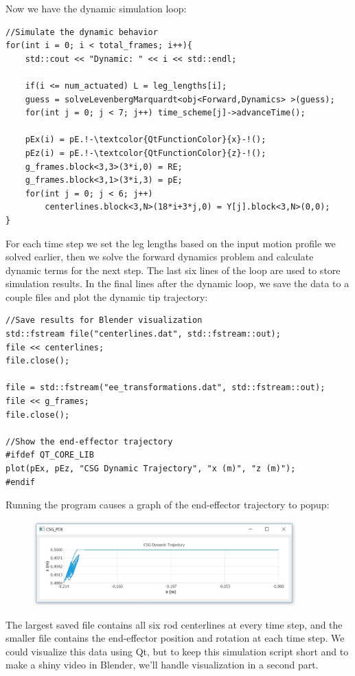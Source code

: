 \documentclass[12pt]{article}
\begin{document}
Now we have the dynamic simulation loop:
\begin{lstlisting}
//Simulate the dynamic behavior
for(int i = 0; i < total_frames; i++){
    std::cout << "Dynamic: " << i << std::endl;

    if(i <= num_actuated) L = leg_lengths[i];
    guess = solveLevenbergMarquardt<obj<Forward,Dynamics> >(guess);
    for(int j = 0; j < 7; j++) time_scheme[j]->advanceTime();

    pEx(i) = pE.!-\textcolor{QtFunctionColor}{x}-!();
    pEz(i) = pE.!-\textcolor{QtFunctionColor}{z}-!();
    g_frames.block<3,3>(3*i,0) = RE;
    g_frames.block<3,1>(3*i,3) = pE;
    for(int j = 0; j < 6; j++)
        centerlines.block<3,N>(18*i+3*j,0) = Y[j].block<3,N>(0,0);
}
\end{lstlisting}
For each time step we set the leg lengths based on the input motion profile we solved earlier, then we solve the forward dynamics problem and calculate dynamic terms for the next step. The last six lines of the loop are used to store simulation results. In the final lines after the dynamic loop, we save the data to a couple files and plot the dynamic tip trajectory:
\begin{lstlisting}
//Save results for Blender visualization
std::fstream file("centerlines.dat", std::fstream::out);
file << centerlines;
file.close();

file = std::fstream("ee_transformations.dat", std::fstream::out);
file << g_frames;
file.close();

//Show the end-effector trajectory
#ifdef QT_CORE_LIB
plot(pEx, pEz, "CSG Dynamic Trajectory", "x (m)", "z (m)");
#endif
\end{lstlisting}
Running the program causes a graph of the end-effector trajectory to popup:
\begin{figure}[h]
	\centering
		\includegraphics[width=0.9\textwidth]{fig/SolutionPlot.jpg}
	\label{fig:SolutionPlot}
\end{figure}

\noindent The largest saved file contains all six rod centerlines at every time step, and the smaller file contains the end-effector position and rotation at each time step. We could visualize this data using Qt, but to keep this simulation script short and to make a shiny video in Blender, we'll handle visualization in a second part.
\end{document}
